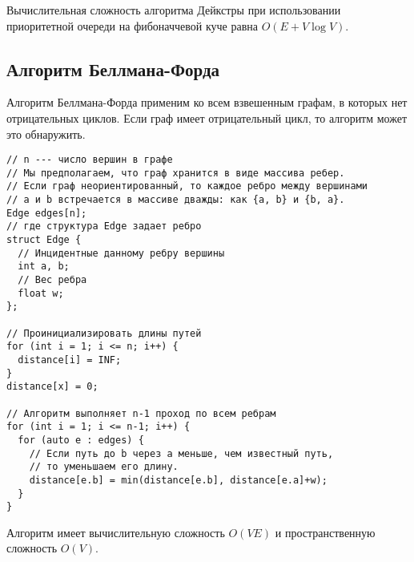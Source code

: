 Вычислительная сложность алгоритма Дейкстры при использовании приоритетной очереди
на фибоначчевой куче равна $O(E + V\log V)$.

\subsection{Алгоритм Беллмана-Форда}
Алгоритм Беллмана-Форда применим ко всем взвешенным графам, в которых нет отрицательных
циклов. Если граф имеет отрицательный цикл, то алгоритм может это обнаружить.

\begin{verbatim}
// n --- число вершин в графе
// Мы предполагаем, что граф хранится в виде массива ребер.
// Если граф неориентированный, то каждое ребро между вершинами
// a и b встречается в массиве дважды: как {a, b} и {b, a}.
Edge edges[n];
// где структура Edge задает ребро
struct Edge {
  // Инцидентные данному ребру вершины
  int a, b;
  // Вес ребра
  float w;
};

// Проинициализировать длины путей
for (int i = 1; i <= n; i++) {
  distance[i] = INF;
}
distance[x] = 0;

// Алгоритм выполняет n-1 проход по всем ребрам
for (int i = 1; i <= n-1; i++) {
  for (auto e : edges) {
    // Если путь до b через a меньше, чем известный путь,
    // то уменьшаем его длину.
    distance[e.b] = min(distance[e.b], distance[e.a]+w);
  }
}
\end{verbatim}
Алгоритм имеет вычислительную сложность $O(VE)$ и пространственную сложность $O(V)$.



  
